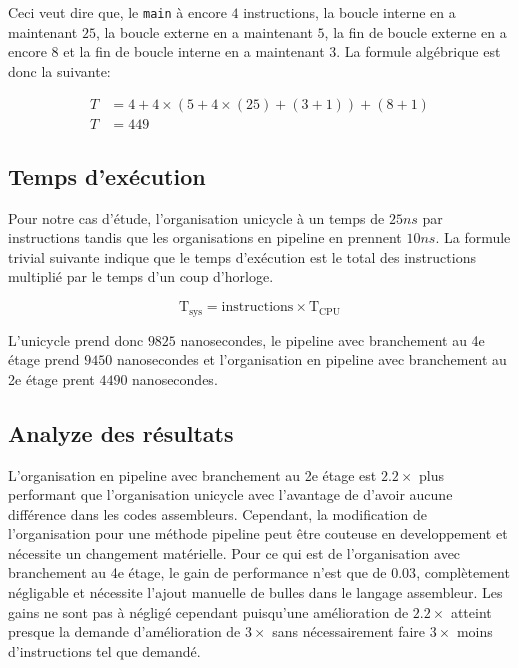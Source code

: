 \documentclass[a11paper]{article}
\newcommand{\todo}[1]{\begin{color}{Red}\textbf{TODO:} #1\end{color}}
\begin{document}
Ceci veut dire que, le \verb|main| à encore $4$ instructions, la boucle
interne en a maintenant $25$, la boucle externe en a maintenant $5$, la fin
de boucle externe en a encore $8$ et la fin de boucle interne en a maintenant
$3$. La formule algébrique est donc la suivante:

\begin{align}
  T &= 4+ 4\times(5+4\times(25)+(3+1)) + (8+1) \\
  T &= 449
\end{align}

\subsection{Temps d'exécution}


Pour notre cas d'étude, l'organisation unicycle à un temps de $25ns$ par
instructions tandis que les organisations en pipeline en prennent $10ns$. La
formule trivial suivante indique que le temps d'exécution est le total des
instructions multiplié par le temps d'un coup d'horloge.

\begin{equation}
\text{T}_{\text{sys}} = \text{instructions}\times\text{T}_{\text{CPU}}
\end{equation}

L'unicycle prend donc $9825$ nanosecondes, le pipeline avec branchement au 4e
étage prend $9450$ nanosecondes et l'organisation en pipeline avec
branchement au 2e étage prent $4490$ nanosecondes.

\subsection{Analyze des résultats}

L'organisation en pipeline avec branchement au 2e étage est $2.2\times$ plus
performant que l'organisation unicycle avec l'avantage de d'avoir aucune
différence dans les codes assembleurs. Cependant, la modification de
l'organisation pour une méthode pipeline peut être couteuse en developpement
et nécessite un changement matérielle. Pour ce qui est de l'organisation avec
branchement au 4e étage, le gain de performance n'est que de $0.03$,
complètement négligable et nécessite l'ajout manuelle de bulles dans le
langage assembleur. Les gains ne sont pas à négligé cependant puisqu'une
amélioration de $2.2\times$ atteint presque la demande d'amélioration de
$3\times$ sans nécessairement faire $3\times$ moins d'instructions tel que
demandé.
\end{document}

